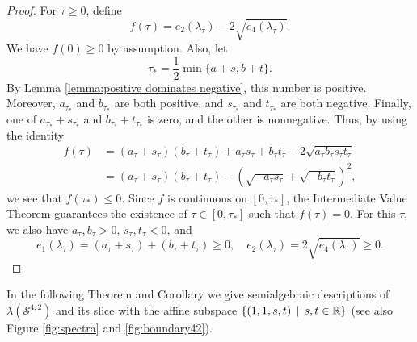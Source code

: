 \documentclass[reqno,hidelinks,11pt]{amsart}
\numberwithin{equation}{section}
\def\RR{\mathbb{R}}
\def\S{\mathcal{S}}
\newcommand{\suchthat}{\;\ifnum\currentgrouptype=16 \middle\fi|\;}
\begin{document}
\begin{proof}
    For $\tau \geq 0$, define 
    \[
    f(\tau) = e_2(\lambda_\tau) - 2\sqrt{e_4(\lambda_\tau)}.
    \]
    We have \(f(0) \geq 0\) by assumption. Also, let
    \[
    \tau_* =  \frac12\min\{a + s, b + t\}.
    \]
    By Lemma \ref{lemma:positive dominates negative}, this number is positive. Moreover, $a_{\tau_*}$ and $b_{\tau_*}$ are both positive, and $s_{\tau_*}$ and $t_{\tau_*}$ are both negative. Finally, one of 
    $a_{\tau_*} + s_{\tau_*}$ and $b_{\tau_*} + t_{\tau_*}$
    is zero, and the other is nonnegative. Thus, by using the identity
    \begin{align}
    f(\tau) &= (a_\tau + s_\tau)(b_\tau + t_\tau) + a_\tau s_\tau + b_\tau t_\tau - 2\sqrt{a_\tau b_\tau s_\tau t_\tau} \nonumber \\
    &= (a_\tau + s_\tau)(b_\tau + t_\tau) - (\sqrt{-a_\tau s_\tau} + \sqrt{-b_\tau t_\tau})^2, \label{eq: e2e4}
    \end{align}
    we see that $f(\tau_*) \leq 0$. Since $f$ is continuous on $[0, \tau_*]$, the Intermediate Value Theorem guarantees the existence of $\tau \in [0, \tau_*]$ such that $f(\tau) = 0$. For this $\tau$, we also have $a_\tau, b_\tau > 0$, $s_\tau, t_\tau < 0$, and
    \[e_1(\lambda_\tau) = (a_\tau + s_\tau) + (b_\tau + t_\tau) \geq 0, \quad e_2(\lambda_\tau) = 2\sqrt{e_4(\lambda_\tau)} \geq 0.\]
\end{proof}

In the following Theorem and Corollary we give semialgebraic descriptions of $\lambda(\S^{4,2})$ and its slice with the affine subspace $\{(1,1,s,t) \, \suchthat \, s,t \in \RR\}$ (see also Figure \ref{fig:spectra} and \ref{fig:boundary42}).
\end{document}

